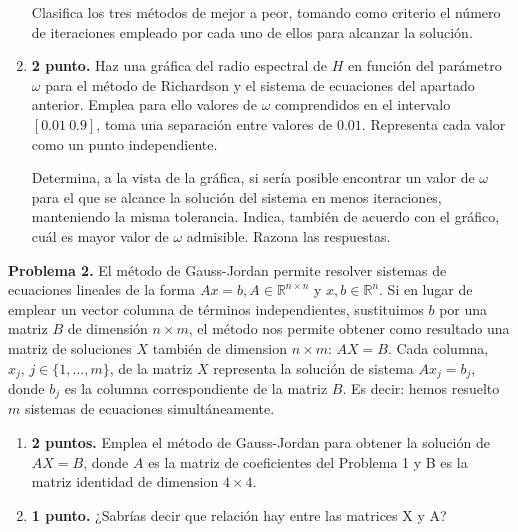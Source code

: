 \begin{enumerate}
Clasifica los tres métodos de mejor a peor, tomando como criterio el número de iteraciones empleado por cada uno de ellos para alcanzar la solución.


\item {\bf 2 punto.} Haz una gráfica del radio espectral de $H$ en función del parámetro $\omega$ para el método de Richardson y el sistema de ecuaciones del apartado anterior. Emplea para ello valores de $\omega$ comprendidos en el intervalo $[0.01\ 0.9]$, toma una separación entre valores de $0.01$.  Representa cada valor como un punto independiente.

Determina, a la vista de la gráfica, si sería posible encontrar un valor de $\omega$ para el que se alcance la solución del sistema en menos iteraciones, manteniendo la misma tolerancia. Indica, también de acuerdo con el gráfico, cuál es mayor valor de $\omega$ admisible. Razona las respuestas.
\end{enumerate}

\noindent \textbf{Problema 2.} El método de Gauss-Jordan permite resolver sistemas de ecuaciones lineales de la forma $Ax =b, A \in \mathbb{R}^{n\times n}$ y $x,b  \in \mathbb{R}^{n}$. Si en lugar de emplear un vector columna de términos independientes, sustituimos $b$ por una matriz $B$ de dimensión $n\times m$, el método nos permite obtener como resultado una matriz de soluciones $X$ también de dimension  $n\times m$: $AX=B$. Cada columna, $x_j, \, j\in\{1,\dots,m\}$, de la matriz $X$ representa la solución de sistema $Ax_j=b_j$, donde $b_j$ es la columna correspondiente de la matriz $B$. Es decir: hemos resuelto $m$ sistemas de ecuaciones simultáneamente.

\begin{enumerate}
\item {\bf 2 puntos.} Emplea el método de Gauss-Jordan para obtener la solución de $AX=B$, donde $A$ es la matriz de coeficientes del Problema 1 y B es la matriz identidad de dimension $4\times4$.
\item {\bf 1 punto.} ¿Sabrías decir que relación hay entre las matrices X y A?
\end{enumerate}

